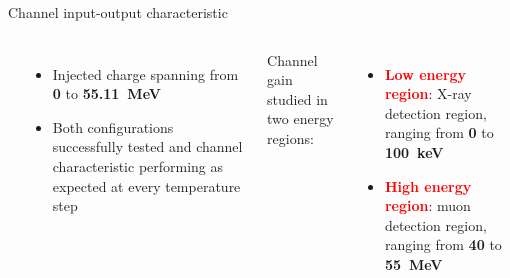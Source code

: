 \documentclass[aspectratio=169,xcolor=dvipsnames]{beamer} %
\newcommand{\greencheck}{{\color{ForestGreen}\checkmark}}
\begin{document}
\begin{frame}{Channel input-output characteristic}
\begin{columns}
\begin{center}
            \end{center}    
            \vskip-0.2cm
            \begin{itemize}
                \item Injected charge spanning from \textbf{0} to \textbf{\SI{55.11}{\mega\electronvolt}} \greencheck
                \item Both configurations successfully tested and channel characteristic performing as expected at every temperature step \greencheck
            \end{itemize}
            \vskip0.3cm
            Channel gain studied in two energy regions:
            \begin{itemize}
                \item \textbf{\textcolor{Red}{Low energy region}}: X-ray detection region, ranging from \textbf{0} to \textbf{\SI{100}{\kilo\electronvolt}}
                \item \textbf{\textcolor{Red}{High energy region}}: muon detection region, ranging from \textbf{40} to \textbf{\SI{55}{\mega\electronvolt}}
            \end{itemize}
            \vspace{0.4cm}
    \end{columns}
\end{frame}


\end{document}
